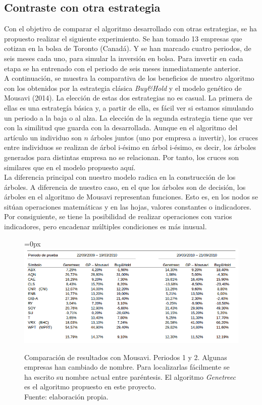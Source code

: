 \subsection{Contraste con otra estrategia}

Con el objetivo de comparar el algoritmo desarrollado con otras estrategias, se ha propuesto realizar el siguiente experimiento. Se han tomado 13 empresas que cotizan en la bolsa de Toronto (Canad\'a). Y se han marcado cuatro periodos, de seis meses cada uno, para simular la inversi\'on en bolsa. Para invertir en cada etapa se ha entrenado con el periodo de seis meses inmediatamente anterior.\\

A continuaci\'on, se muestra la comparativa de los beneficios de nuestro algoritmo con los obtenidos por la estrategia cl\'asica \textit{Buy\&Hold} y el modelo gen\'etico de Mousavi (2014). La elecci\'on de estas dos estrategias no es casual. La primera de ellas es una estrateg\'ia b\'asica y, a partir de ella, es f\'acil ver si estamos simulando un periodo a la baja o al alza. La elecci\'on de la segunda estrategia tiene que ver con la similitud que guarda con la desarrollada. Aunque en el algoritmo del art\'iculo un individuo son $n$ \'arboles juntos (uno por empresa a invertir), los cruces entre individuos se realizan de \'arbol i-\'esimo en \'arbol i-\'esimo, es decir, los \'arboles generados para distintas  empresa no se relacionan. Por tanto, los cruces son similares que en el modelo propuesto aqu\'i.\\

La diferencia principal con nuestro modelo radica en la construcci\'on de los \'arboles. A diferencia de nuestro caso, en el que los \'arboles son de decisi\'on, los \'arboles en el algoritmo de Mousavi representan funciones. Esto es, en los nodos se sit\'uan operaciones matem\'aticas y en las hojas, valores constantes o indicadores. Por consiguiente, se tiene la posibilidad de realizar operaciones con varios indicadores, pero encadenar m\'ultiples condiciones es m\'as inusual.

     	\begin{figure}[H]
     		\centering\leftskip=0px
     		\includegraphics[scale=2]{imagenes/Mousavi1.png}
     		\caption[Comparaci\'on de resultados con Mousavi]{Comparaci\'on de resultados con Mousavi. Periodos 1 y 2. Algunas empresas han cambiado de nombre. Para localizarlas f\'acilmente se ha escrito su nombre actual entre par\'entesis. El algoritmo \textit{Genetreec} es el algoritmo propuesto en este proyecto.\\ Fuente: elaboraci\'on propia.}
     		\label{fig:Mousavi1}
     	\end{figure} 
     

